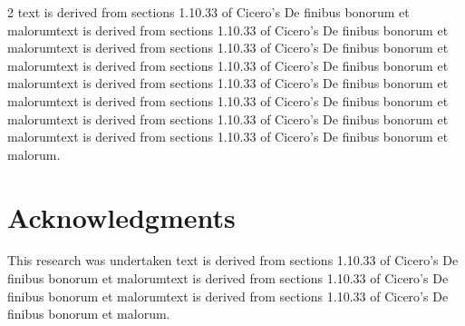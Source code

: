 \documentclass{article}
\begin{document}
\begin{minipage}[c]{\linewidth}
\begin{framed}
\begin{multicols}{2}
text is derived from sections 1.10.33 of Cicero's De finibus bonorum et malorumtext is derived from sections 1.10.33 of Cicero's De finibus bonorum et malorumtext is derived from sections 1.10.33 of Cicero's De finibus bonorum et malorumtext is derived from sections 1.10.33 of Cicero's De finibus bonorum et malorumtext is derived from sections 1.10.33 of Cicero's De finibus bonorum et malorumtext is derived from sections 1.10.33 of Cicero's De finibus bonorum et malorumtext is derived from sections 1.10.33 of Cicero's De finibus bonorum et malorumtext is derived from sections 1.10.33 of Cicero's De finibus bonorum et malorum.
\section*{Acknowledgments}
\tiny \textnormal{This research was undertaken text is derived from sections 1.10.33 of Cicero's De finibus bonorum et malorumtext is derived from sections 1.10.33 of Cicero's De finibus bonorum et malorumtext is derived from sections 1.10.33 of Cicero's De finibus bonorum et malorum.}
\end{multicols}
\vspace{0.5cm}
\end{framed}
\end{minipage}
\end{document}
